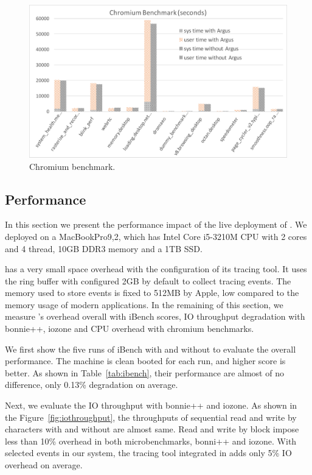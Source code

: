 \begin{figure}
	\centering
		\includegraphics[width=\columnwidth]{./figures/performance_cr.pdf}
	\caption{Chromium benchmark.}
	\label{fig:chromium benchmark}
\end{figure}


\subsection{Performance} \label{sec:evaluation}

In this section we present the performance impact of the live deployment of
\xxx. We deployed \xxx on a MacBookPro9,2, which has Intel Core i5-3210M CPU with
2 cores and 4 thread, 10GB DDR3 memory and a 1TB SSD.

\xxx has a very small space overhead with the configuration of its tracing
tool. It uses the ring buffer with configured 2GB by default to collect tracing
events. The memory used to store events is fixed to 512MB by Apple, 
low compared to the memory usage of modern applications. In the remaining
of this section, we measure \xxx's overhead overall with iBench scores, IO
throughput degradation with bonnie++, iozone and CPU overhead with chromium
benchmarks.


We first show the five runs of iBench with and without \xxx to evaluate the
overall performance. The machine is clean booted for each run, and higher
score is better. As shown in Table~\ref{tab:ibench}, their
performance are almost of no difference, only 0.13\% degradation on average.


Next, we evaluate the IO throughput with bonnie++ and iozone. As shown in the
Figure~\ref{fig:iothroughput}, the throughputs of sequential read and write
by characters with and without \xxx are almost same. Read and write by block
impose less than 10\% overhead in  both microbenchmarks, bonni++ and iozone.
With selected events in our system, the tracing tool integrated in \xxx
adds only 5\% IO overhead on average.

